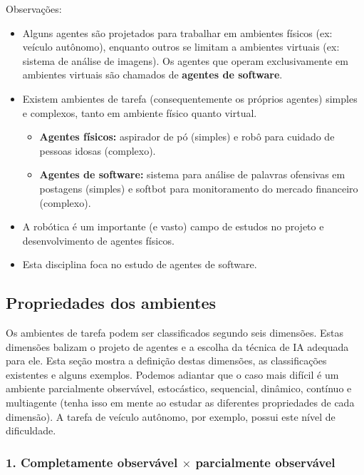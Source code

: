 Observações:
\begin{itemize}
	\item Alguns agentes são projetados para trabalhar em ambientes físicos (ex: veículo autônomo), enquanto outros se limitam a ambientes virtuais (ex: sistema de análise de imagens). Os agentes que operam exclusivamente em ambientes virtuais são chamados de \textbf{agentes de software}.
	
	\item Existem ambientes de tarefa (consequentemente os próprios agentes) simples e complexos, tanto em ambiente físico quanto virtual.
	\begin{itemize}
		\item \textbf{Agentes físicos:} aspirador de pó (simples) e robô para cuidado de pessoas idosas (complexo).
		\item \textbf{Agentes de software:} sistema para análise de palavras ofensivas em postagens (simples) e softbot para monitoramento do mercado financeiro (complexo).
	\end{itemize}
	
	\item A robótica é um importante (e vasto) campo de estudos no projeto e desenvolvimento de agentes físicos.
	
	\item Esta disciplina foca no estudo de agentes de software.
\end{itemize}

\subsection{Propriedades dos ambientes}

Os ambientes de tarefa podem ser classificados segundo seis dimensões. Estas dimensões balizam o projeto de agentes e a escolha da técnica de IA adequada para ele. Esta seção mostra a definição destas dimensões, as classificações existentes e alguns exemplos. Podemos adiantar que o caso mais difícil é um ambiente parcialmente observável, estocástico, sequencial, dinâmico, contínuo e multiagente (tenha isso em mente ao estudar as diferentes propriedades de cada dimensão). A tarefa de veículo autônomo, por exemplo, possui este nível de dificuldade.

\subsubsection{1. Completamente observável $\times$ parcialmente observável}

